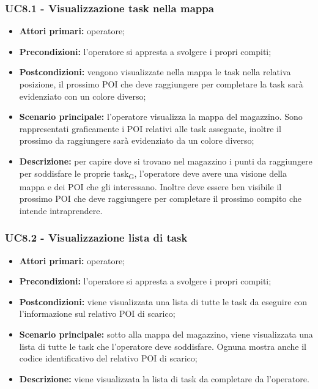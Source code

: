 \subsubsection{UC8.1 - Visualizzazione task nella mappa}
\begin{itemize}
	\item 	\textbf{Attori primari:} operatore;
	\item 	\textbf{Precondizioni:} l'operatore si appresta a svolgere i propri compiti;
	\item 	\textbf{Postcondizioni:} vengono visualizzate nella mappa le task nella relativa posizione, il prossimo POI che deve raggiungere per completare la task sarà evidenziato con un colore diverso;
	\item 	\textbf{Scenario principale:} l'operatore visualizza la mappa del magazzino. Sono rappresentati graficamente i POI relativi alle task assegnate, inoltre il prossimo da raggiungere sarà evidenziato da un colore diverso;
	\item 	\textbf{Descrizione:} per capire dove si trovano nel magazzino i punti da raggiungere per soddisfare le proprie task\textsubscript{G}, l'operatore deve avere una visione della mappa e dei POI che gli interessano. Inoltre deve essere ben visibile il prossimo POI che deve raggiungere per completare il prossimo compito che intende intraprendere.
\end{itemize}



\subsubsection{UC8.2 - Visualizzazione lista di task}
\begin{itemize}
	\item 	\textbf{Attori primari:} operatore;
	\item 	\textbf{Precondizioni:} l'operatore si appresta a svolgere i propri compiti;
	\item 	\textbf{Postcondizioni:} viene visualizzata una lista di tutte le task da eseguire con l'informazione sul relativo POI di scarico;
	\item 	\textbf{Scenario principale:} sotto alla mappa del magazzino, viene visualizzata una lista di tutte le task che l'operatore deve soddisfare. Ognuna mostra anche il codice identificativo del relativo POI di scarico;
	\item 	\textbf{Descrizione:} viene visualizzata la lista di task da completare da l'operatore.
\end{itemize}

